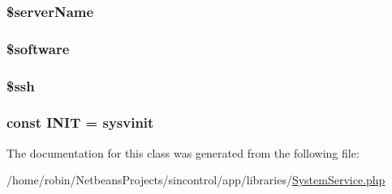 \subsubsection[{\$server\+Name}]{\setlength{\rightskip}{0pt plus 5cm}\$server\+Name\hspace{0.3cm}{\ttfamily [protected]}}\label{class_system_service_ab05851c38639d62e5eb8c069a7f033df}
\hypertarget{class_system_service_a9cd64e3508f6c0a0584ab9e759ad5fe1}{}
\subsubsection[{\$software}]{\setlength{\rightskip}{0pt plus 5cm}\$software\hspace{0.3cm}{\ttfamily [protected]}}\label{class_system_service_a9cd64e3508f6c0a0584ab9e759ad5fe1}
\hypertarget{class_system_service_ac5d5f66bf0113d0d35de8d8720b191fa}{}
\subsubsection[{\$ssh}]{\setlength{\rightskip}{0pt plus 5cm}\$ssh\hspace{0.3cm}{\ttfamily [protected]}}\label{class_system_service_ac5d5f66bf0113d0d35de8d8720b191fa}
\hypertarget{class_system_service_a57a69f62cb572acac15fa0e1a6cac3ee}{}
\subsubsection[{I\+N\+I\+T}]{\setlength{\rightskip}{0pt plus 5cm}const I\+N\+I\+T = \textquotesingle{}sysvinit\textquotesingle{}}\label{class_system_service_a57a69f62cb572acac15fa0e1a6cac3ee}


The documentation for this class was generated from the following file\+:\begin{DoxyCompactItemize}
\item 
/home/robin/\+Netbeans\+Projects/sincontrol/app/libraries/\hyperlink{_system_service_8php}{System\+Service.\+php}\end{DoxyCompactItemize}

